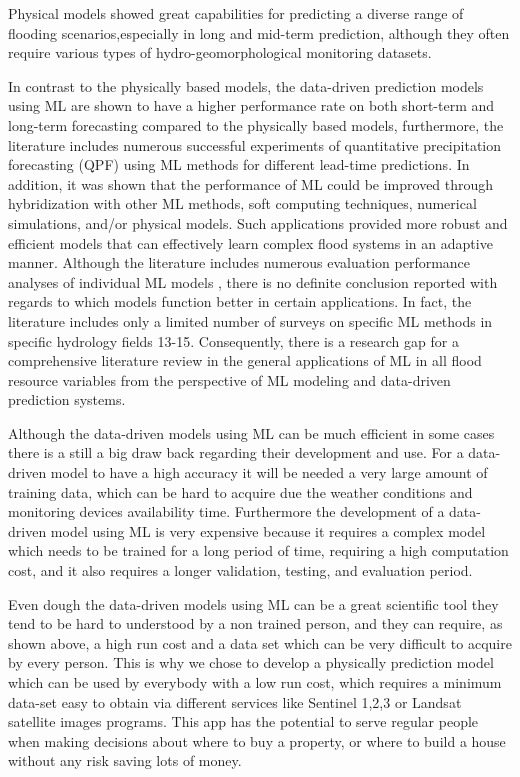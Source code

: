 \documentclass[12pt, a4paper]{report}
\begin{document}
Physical models showed great capabilities for predicting a diverse range of flooding scenarios\cite{6},especially in long and mid-term prediction, although they often require various types of hydro-geomorphological monitoring datasets. 
\par 

In contrast to the physically based models, the data-driven prediction models using ML are shown to have a higher performance rate on both short-term and long-term forecasting compared to the physically based models, furthermore, the literature includes numerous successful experiments of quantitative precipitation forecasting (QPF) using ML methods for different lead-time predictions\cite{7,8}. In addition,  it was shown that the performance of ML could be improved through hybridization  with other ML methods, soft computing techniques, numerical simulations, and/or physical models. Such applications provided more robust and efficient models that can effectively learn complex flood systems in an adaptive manner. Although the literature includes numerous evaluation performance analyses of individual ML models \cite{9-12}, there is no definite conclusion reported with regards to which models function better in certain applications. In fact, the literature includes only a limited number of surveys on specific ML methods in specific hydrology fields {13-15}. Consequently, there is a research gap for a comprehensive literature review in the general applications of ML in all flood resource variables from the perspective of ML modeling and data-driven prediction systems.
\par 

Although the data-driven models using ML can be much efficient in some cases there is a still a big draw back regarding their development and use. For a data-driven model to have a high accuracy it will be needed a very large amount of training data, which can be hard to acquire due the weather conditions and monitoring devices availability time. Furthermore the development of a data-driven model using ML is very expensive because it requires a complex model which needs to be trained for a long period of time, requiring a high computation cost, and it also requires a longer validation, testing, and evaluation period.
\par

Even dough the data-driven models using ML can be a great scientific tool they tend to be hard to understood by a non trained person, and they can require, as shown above, a high run cost and a data set which can be very difficult to acquire by every person. This is why we chose to develop a physically prediction model which can be used by everybody with a low run cost, which requires a minimum data-set easy to obtain via different services like Sentinel 1,2,3 or Landsat satellite images programs. This app has the potential to serve regular people when making decisions about where to buy a property, or where to build a house without any risk saving lots of money.
\par
\end{document}
